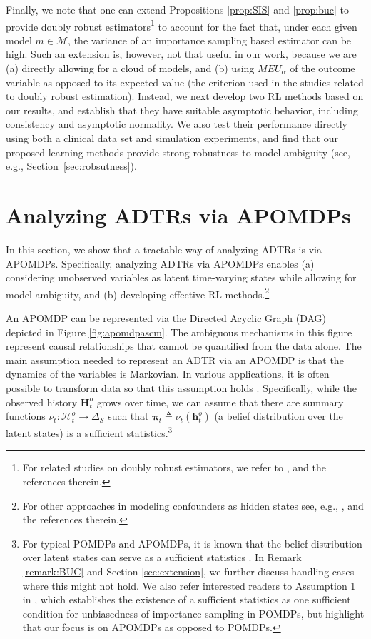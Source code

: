 \documentclass[opre,nonblindrev]{informs2}%
\newcommand{\teq}{\triangleq}
\newcommand{\1}{\hbox{\rm 1\kern-.35em 1}}
\newcommand{\MS}{\mathscr S}
\newcommand{\MM}{\mathscr M}
\newcommand{\MH}{\mathscr H}
\newcommand{\bpi}{\boldsymbol{\pi}}
\newcommand{\bH}{\mathbf{H}}
\newcommand{\bh}{\mathbf{h}}
\begin{document}
Finally, we note that one can extend Propositions \ref{prop:SIS} and \ref{prop:buc} to provide doubly robust estimators\footnote{For related studies on doubly robust estimators, we refer to \cite{Bang2015, Jiang2015, Thomas2016, Kallus2020, Athey2021}, and the references therein.}  to account for the fact that, under each given model $m\in\MM$, the variance of an importance sampling based estimator can be high. Such an extension is, however, not that useful in our work, because we are (a) directly allowing for  a cloud of models, and (b) using $MEU_\alpha$ of the outcome variable as opposed to its expected value (the criterion used in the studies related to doubly robust estimation). Instead, we next develop two RL methods based on our results, and establish that they have suitable asymptotic behavior, including consistency and asymptotic normality. We also test their performance directly using both a clinical data set and simulation experiments, and find that our proposed learning methods provide strong robustness to model ambiguity (see, e.g., Section~\ref{sec:robsutness}).




\section{Analyzing ADTRs via APOMDPs}\label{sec:APOMDP}

In this section, we show that a tractable way of analyzing ADTRs is via  APOMDPs. Specifically, analyzing ADTRs  via  APOMDPs enables (a) considering unobserved variables as latent time-varying states while allowing for model ambiguity, and (b) developing effective RL methods.\footnote{For other approaches in modeling confounders as hidden states see, e.g., \cite{Bennett2021, Xu2020}, and the references therein.}

An APOMDP \citep{Saghafian2018} can be represented via the Directed Acyclic Graph (DAG) depicted in Figure \ref{fig:apomdpascm}.  The ambiguous mechanisms in this figure represent causal relationships that cannot be quantified from the data alone. The main  assumption needed to represent an ADTR via an APOMDP is that the dynamics of the variables is Markovian. In various applications, it is often possible to transform data so that this assumption holds \citep[see, e.g.,][]{Xu2020}. Specifically, while the observed history $\bH^o_t$ grows over time, we can assume  that there are summary functions $\nu_t:\MH_t^o\to\Delta_\MS$ such that $\bpi_t\teq\nu_t(\bh_t^o)$ (a belief distribution over the latent states) is a sufficient statistics.\footnote{For typical POMDPs and APOMDPs, it is known that the belief distribution over latent states can serve as a sufficient statistics \citep[see, e.g.,][and the references therein]{Saghafian2018, Boloori2020,Saghafian20194}. In Remark \ref{remark:BUC} and Section \ref{sec:extension}, we further discuss handling cases where this might not hold. We also refer interested readers to Assumption 1 in \cite{Tennenholtz2019}, which establishes the existence of a sufficient statistics as one sufficient condition for unbiasedness of importance sampling in POMDPs, but highlight that our focus is on APOMDPs as opposed to POMDPs.}
\end{document}
